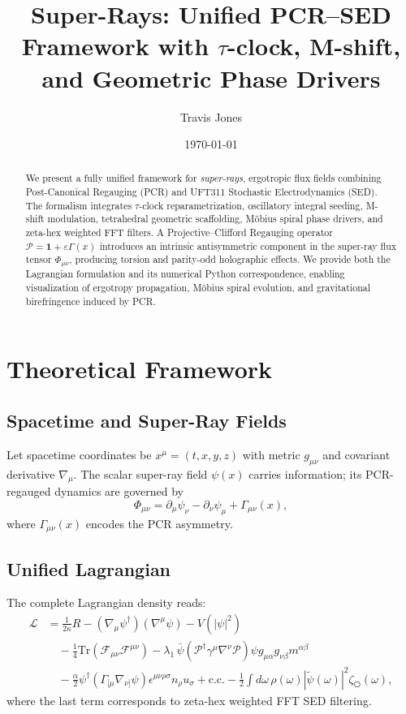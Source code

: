 \documentclass[12pt]{article}
\title{Super-Rays: Unified PCR--SED Framework with $\tau$-clock, M-shift, and Geometric Phase Drivers}
\author{Travis Jones}
\date{\today}
\begin{document}
\maketitle

\begin{abstract}
We present a fully unified framework for \emph{super-rays}, ergotropic flux fields combining Post-Canonical Regauging (PCR) and UFT311 Stochastic Electrodynamics (SED). 
The formalism integrates $\tau$-clock reparametrization, oscillatory integral seeding, M-shift modulation, tetrahedral geometric scaffolding, Möbius spiral phase drivers, and zeta-hex weighted FFT filters. 
A Projective–Clifford Regauging operator $\mathcal{P}=\mathbf{1}+\varepsilon \Gamma(x)$ introduces an intrinsic antisymmetric component in the super-ray flux tensor $\Phi_{\mu\nu}$, producing torsion and parity-odd holographic effects. 
We provide both the Lagrangian formulation and its numerical Python correspondence, enabling visualization of ergotropy propagation, Möbius spiral evolution, and gravitational birefringence induced by PCR.
\end{abstract}

\section{Theoretical Framework}

\subsection{Spacetime and Super-Ray Fields}
Let spacetime coordinates be $x^\mu=(t,x,y,z)$ with metric $g_{\mu\nu}$ and covariant derivative $\nabla_\mu$. 
The scalar super-ray field $\psi(x)$ carries information; its PCR-regauged dynamics are governed by
\begin{equation}
\Phi_{\mu\nu} = \partial_\mu \psi_\nu - \partial_\nu \psi_\mu + \Gamma_{\mu\nu}(x),
\end{equation}
where $\Gamma_{\mu\nu}(x)$ encodes the PCR asymmetry.

\subsection{Unified Lagrangian}
The complete Lagrangian density reads:
\begin{align}
\mathcal{L} &= \frac{1}{2\kappa} R 
- (\nabla_\mu \psi^\dagger)(\nabla^\mu \psi) - V(|\psi|^2) \nonumber\\
&\quad - \frac{1}{4} \mathrm{Tr}(\mathcal{F}_{\mu\nu} \mathcal{F}^{\mu\nu}) 
- \lambda_1\,\bar\psi (\mathcal{P}^\dagger \gamma^\mu \nabla^\nu \mathcal{P}) \psi g_{\mu\alpha} g_{\nu\beta} m^{\alpha\beta} \nonumber\\
&\quad - \frac{\alpha}{2} \psi^\dagger (\Gamma_{[\mu}\nabla_{\nu]}\psi) \epsilon^{\mu\nu\rho\sigma} n_\rho u_\sigma + \mathrm{c.c.} 
- \frac{1}{2} \int d\omega\, \rho(\omega) |\tilde{\psi}(\omega)|^2 \zeta_{\hexagon}(\omega),
\end{align}
where the last term corresponds to zeta-hex weighted FFT SED filtering.
\end{document}
